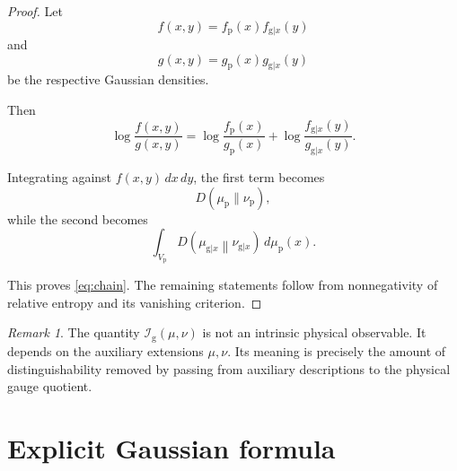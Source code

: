 \documentclass[11pt]{article}
\theoremstyle{remark}
\newtheorem{remark}[theorem]{Remark}
\begin{document}
\begin{proof}
Let
\begin{equation}
f(x,y)
=
f_{\mathrm p}(x)f_{\mathrm g|x}(y)
\end{equation}
and
\begin{equation}
g(x,y)
=
g_{\mathrm p}(x)g_{\mathrm g|x}(y)
\end{equation}
be the respective Gaussian densities.

Then
\begin{equation}
\log\frac{f(x,y)}{g(x,y)}
=
\log\frac{
f_{\mathrm p}(x)
}{
g_{\mathrm p}(x)
}
+
\log\frac{
f_{\mathrm g|x}(y)
}{
g_{\mathrm g|x}(y)
}.
\end{equation}

Integrating against \(f(x,y)\,dx\,dy\), the first term becomes
\begin{equation}
D(\mu_{\mathrm p}\|\nu_{\mathrm p}),
\end{equation}
while the second becomes
\begin{equation}
\int_{V_{\mathrm p}}
D\left(
\mu_{\mathrm g|x}
\middle\|
\nu_{\mathrm g|x}
\right)
\,d\mu_{\mathrm p}(x).
\end{equation}

This proves \eqref{eq:chain}. The remaining statements follow
from nonnegativity of relative entropy and its vanishing
criterion.
\end{proof}

\begin{remark}
The quantity \(\mathcal I_{\mathrm g}(\mu,\nu)\) is not an
intrinsic physical observable. It depends on the auxiliary
extensions \(\mu,\nu\). Its meaning is precisely the amount
of distinguishability removed by passing from auxiliary
descriptions to the physical gauge quotient.
\end{remark}

\section{Explicit Gaussian formula}
\end{document}
